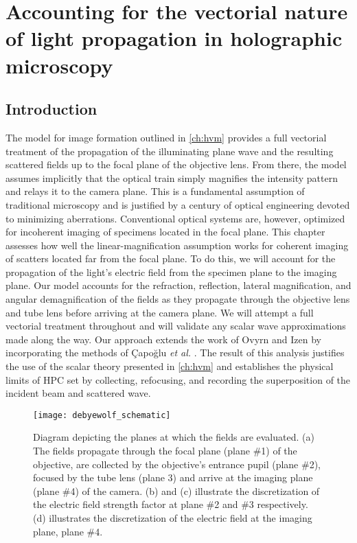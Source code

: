 \chapter{Accounting for the vectorial nature of light propagation in holographic microscopy}
\label{ch:debye}




\section{Introduction}

The model for image formation outlined in \autoref{ch:hvm} provides a full
vectorial treatment of the propagation of the illuminating plane wave and
the resulting scattered fields up to the focal plane of the objective lens.
From there, the model assumes implicitly that the optical train
simply magnifies the intensity pattern and relays it to the camera plane.
This is a fundamental assumption of traditional microscopy and is justified
by a century of optical engineering devoted to minimizing aberrations.
Conventional optical systems are, however, optimized for incoherent imaging of
specimens located in the focal plane.
This chapter assesses how well the linear-magnification assumption works for
coherent imaging of scatters located far from the focal plane. To do this, we will
account for the propagation of the light's electric field from
the specimen plane to the imaging plane. Our model accounts for the
refraction, reflection, lateral magnification, and angular demagnification
of the fields as they propagate through the objective lens and tube lens
before arriving at the camera plane. We will attempt a full vectorial
treatment throughout and will validate any scalar wave approximations
made along the way. Our approach extends the work of
Ovyrn and Izen\cite{izen00} by incorporating the methods of \c{C}apo\u{g}lu \emph{et al.}
\cite{capoglu12}. 
The result of this analysis justifies the use of the scalar theory presented in \autoref{ch:hvm} and
establishes the physical limits of HPC set by collecting, refocusing, and recording
the superposition of the incident beam and scattered wave.

\begin{figure}
  \centering
  \texttt{[image: debyewolf\_schematic]}
  \caption{Diagram depicting the planes at which the fields are evaluated.
    (a) The fields propagate through the focal plane (plane \#1) of the objective,
    are collected by the objective's entrance pupil (plane \#2), focused by the tube lens (plane 3)
    and arrive at the imaging plane (plane \#4) of the camera. (b) and (c) illustrate the
    discretization of the electric field strength factor at plane \#2 and \#3 respectively.
    (d) illustrates the discretization of the electric field at the imaging plane, plane \#4.}
  \label{fig:debye_schematic}
\end{figure}

